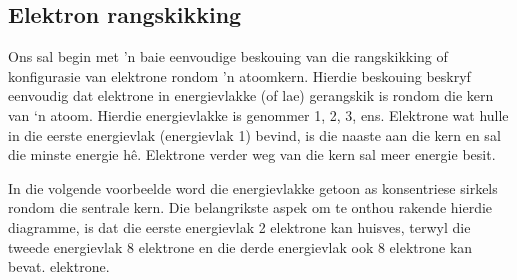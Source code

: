             \subsection*{Elektron rangskikking}
            \nopagebreak
            \label{m38741*id9722401}Ons sal begin met 'n baie eenvoudige beskouing van die rangskikking of konfigurasie van elektrone rondom 'n atoomkern. Hierdie beskouing beskryf eenvoudig dat elektrone in energievlakke (of lae) gerangskik is rondom die kern van ‘n atoom. Hierdie energievlakke is genommer 1, 2, 3, ens. Elektrone wat hulle in die eerste energievlak (energievlak 1) bevind, is die naaste aan die kern en sal die minste energie h\^{e}. Elektrone verder weg van die kern sal meer energie besit.\par 
\label{m38741*id259357}In die volgende voorbeelde word die energievlakke getoon as konsentriese sirkels rondom die sentrale kern. Die belangrikste aspek om te onthou rakende hierdie diagramme, is dat die eerste energievlak 2 elektrone kan huisves, terwyl die tweede energievlak 8 elektrone en die derde energievlak ook 8 elektrone kan bevat. elektrone.\par 
